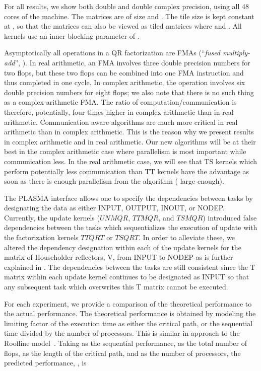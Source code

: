 \documentclass[a4paper,twopages]{article}
\newcommand{\TSQRT}{\ensuremath{\mathit{TSQRT}}\xspace}
\newcommand{\UNMQR}{\ensuremath{\mathit{UNMQR}}\xspace}
\newcommand{\TSMQR}{\ensuremath{\mathit{TSMQR}}\xspace}
\newcommand{\TTQRT}{\ensuremath{\mathit{TTQRT}}\xspace}
\newcommand{\TTMQR}{\ensuremath{\mathit{TTMQR}}\xspace}
\begin{document}
For all results, we show both double and double complex precision, using all 48
cores of the machine.  The matrices are of size  and .  The tile size is kept constant at , so that the
matrices can also be viewed as  tiled matrices where  and . All kernels use an inner blocking parameter of .

Asymptotically all operations in a QR factorization are FMAs (``{\em fused
multiply-add}'', ).  In real arithmetic, an FMA
involves three double precision numbers for two flops, but these two flops can
be combined into one FMA instruction and thus completed in one cycle.  In
complex arithmetic, the operation  involves
six double precision numbers for eight flops; we also note that there is no
such thing as a complex-arithmetic FMA.  The ratio of computation/communication
is therefore, potentially, four times higher in complex arithmetic than
in real arithmetic. Communication aware algorithms are much more critical in
real arithmetic than in complex arithmetic. This is the reason why we present
results in complex arithmetic and in real arithmetic. Our new algorithms will
be at their best in the complex arithmetic case where parallelism is most
important while communication less. In the real arithmetic case, we will see
that TS kernels which perform potentially less communication than TT kernels
have the advantage as soon as there is enough parallelism from the algorithm
( large enough).

The PLASMA interface allows one to specify the dependencies between tasks by
designating the data as either INPUT, OUTPUT, INOUT, or NODEP.  Currently,
the update kernels (\UNMQR, \TTMQR, and
\TSMQR) introduced false dependencies between the tasks which sequentializes
the execution of update with the factorization kernels \TTQRT or \TSQRT.  In
order to alleviate these, we altered the dependency designation within each of
the update kernels for the matrix of Householder reflectors, V, from INPUT to
NODEP as is further explained in \cite{CPE:CPE1467}.  The dependencies between
the tasks are still consistent since the T matrix within each update kernel
continues to be designated as INPUT so that any subsequent task which
overwrites this T matrix cannot be executed.

For each experiment, we provide a comparison of the theoretical performance to
the actual performance.  The theoretical performance is obtained by modeling
the limiting factor of the execution time as either the critical path, or the sequential time
divided by the number of processors.
This is similar in approach to the Roofline
model~\cite{Williams:2009:RIV:1498765.1498785}.  Taking  as the
sequential performance,  as the total number of flops,  as the length of
the critical path, and  as the number of processors, the predicted
performance, , is
\end{document}
